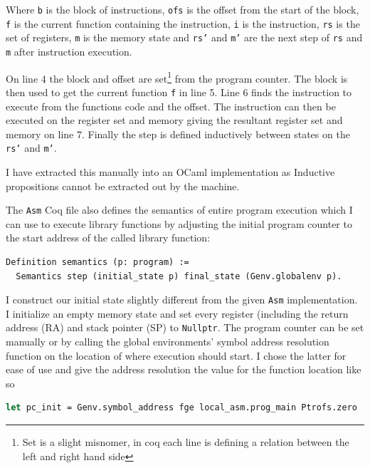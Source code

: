 Where \texttt{b} is the block of instructions, \texttt{ofs} is the offset from the start of the block, \texttt{f} is the current function containing the instruction, \texttt{i} is the instruction, \texttt{rs} is the set of registers, \texttt{m} is the memory state and \texttt{rs'} and \texttt{m'} are the next step of \texttt{rs} and \texttt{m} after instruction execution.

On line 4 the block and offset are set\footnote{Set is a slight misnomer, in coq each line is defining a relation between the left and right hand side} from the program counter. The block is then used to get the current function \texttt{f} in line 5. Line 6 finds the instruction to execute from the functions code and the offset. The instruction can then be executed on the register set and memory giving the resultant register set and memory on line 7. Finally the step is defined inductively between states on the \texttt{rs'} and \texttt{m'}.

I have extracted this manually into an OCaml implementation as Inductive propositions cannot be extracted out by the machine. 

The \texttt{Asm} Coq file also defines the semantics of entire program execution which I can use to execute library functions by adjusting the initial program counter to the start address of the called library function:

\begin{lstlisting}[language=Coq]
Definition semantics (p: program) :=
  Semantics step (initial_state p) final_state (Genv.globalenv p).
\end{lstlisting}

I construct our initial state slightly different from the given \texttt{Asm} implementation. I initialize an empty memory state and set every register (including the return address (RA) and stack pointer (SP) to \texttt{Nullptr}. The program counter can be set manually or by calling the global environments' symbol address resolution function on the location of where execution should start. I chose the latter for ease of use and give the address resolution the value for the function location like so

\begin{lstlisting}[language=Ocaml, numbers=none]
let pc_init = Genv.symbol_address fge local_asm.prog_main Ptrofs.zero
\end{lstlisting}


